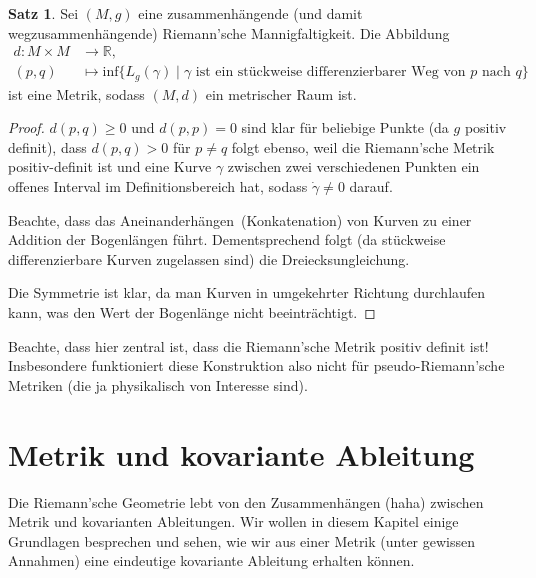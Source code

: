 \documentclass[a4paper]{scrreprt}
\numberwithin{equation}{chapter}
\newcommand{\R}{\mathbb{R}}
\theoremstyle{definition}
\newtheorem{satz}[defn]{Satz}
\begin{document}
		\begin{satz}
			Sei $(M,g)$ eine zusammenhängende (und damit wegzusammenhängende) Riemann'sche Mannigfaltigkeit. Die Abbildung
			\begin{align*}
				d:M\times M&\rightarrow \R,\\
				(p,q)&\mapsto \mathrm{inf}\lbrace L_g(\gamma)\mid \gamma \text{ ist ein stückweise differenzierbarer Weg von $p$ nach } q\rbrace
			\end{align*}
			ist eine Metrik, sodass $(M,d)$ ein metrischer Raum ist.
			\begin{proof}
				$d(p,q)\geq 0$ und $d(p,p)=0$ sind klar für beliebige Punkte (da $g$ positiv definit), dass $d(p,q)>0$ für $p\neq q$ folgt ebenso, weil die Riemann'sche Metrik positiv-definit ist und eine Kurve $\gamma$ zwischen zwei verschiedenen Punkten ein offenes Interval im Definitionsbereich hat, sodass $\dot{\gamma}\neq 0$ darauf.
				
				Beachte, dass das \glqq Aneinanderhängen\grqq\ (Konkatenation) von Kurven zu einer Addition der Bogenlängen führt. Dementsprechend folgt (da stückweise differenzierbare Kurven zugelassen sind) die Dreiecksungleichung.
				
				Die Symmetrie ist klar, da man Kurven in umgekehrter Richtung durchlaufen kann, was den Wert der Bogenlänge nicht beeinträchtigt.
			\end{proof}
		\end{satz}
		Beachte, dass hier zentral ist, dass die Riemann'sche Metrik positiv definit ist! Insbesondere funktioniert diese Konstruktion also nicht für pseudo-Riemann'sche Metriken (die ja physikalisch von Interesse sind).
	\section{Metrik und kovariante Ableitung}
		Die Riemann'sche Geometrie lebt von den Zusammenhängen (haha) zwischen Metrik und kovarianten Ableitungen. Wir wollen in diesem Kapitel einige Grundlagen besprechen und sehen, wie wir aus einer Metrik (unter gewissen Annahmen) eine eindeutige kovariante Ableitung erhalten können.
		
\end{document}
